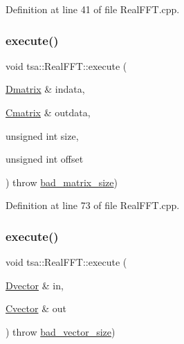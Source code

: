 Definition at line 41 of file Real\+F\+F\+T.\+cpp.

\mbox{\label{classtsa_1_1_real_f_f_t_a8315388a35738d3005bc596852500e56}} 
\subsubsection{\texorpdfstring{execute()}{execute()}\hspace{0.1cm}{\footnotesize\ttfamily [2/3]}}
{\footnotesize\ttfamily void tsa\+::\+Real\+F\+F\+T\+::execute (\begin{DoxyParamCaption}\item[{\hyperlink{namespacetsa_ad260cd21c1891c4ed391fe788569aba4}{Dmatrix} \&}]{indata,  }\item[{\hyperlink{namespacetsa_a86348fef1603a135fe5fba9e5f5486ee}{Cmatrix} \&}]{outdata,  }\item[{unsigned int}]{size,  }\item[{unsigned int}]{offset }\end{DoxyParamCaption}) throw  \hyperlink{classtsa_1_1bad__matrix__size}{bad\+\_\+matrix\+\_\+size}) }



Definition at line 73 of file Real\+F\+F\+T.\+cpp.

\mbox{\label{classtsa_1_1_real_f_f_t_a14b6f0098aed4984d7b969f107df5f2b}} 
\subsubsection{\texorpdfstring{execute()}{execute()}\hspace{0.1cm}{\footnotesize\ttfamily [3/3]}}
{\footnotesize\ttfamily void tsa\+::\+Real\+F\+F\+T\+::execute (\begin{DoxyParamCaption}\item[{\hyperlink{namespacetsa_a8900fb03d849baf447a1a0efe2561fb2}{Dvector} \&}]{in,  }\item[{\hyperlink{namespacetsa_a054d1045ead95a65819e9e5722baf600}{Cvector} \&}]{out }\end{DoxyParamCaption}) throw  \hyperlink{classtsa_1_1bad__vector__size}{bad\+\_\+vector\+\_\+size}) }

